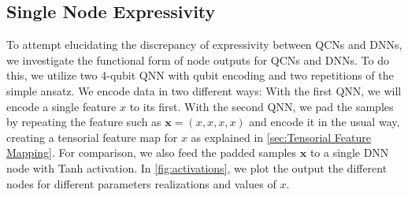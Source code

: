 \subsection{Single Node Expressivity}\label{sec:Single Node Expressivity}
To attempt elucidating the discrepancy of expressivity between QCNs and DNNs, we investigate the functional form of node outputs for QCNs and DNNs. To do this, we utilize two 4-qubit QNN with qubit encoding and two repetitions of the simple ansatz. We encode data in two different ways: With the first QNN, we will encode a single feature $x$ to its first. With the second QNN, we pad the samples by repeating the feature  such as $\boldsymbol{x} = (x, x, x, x)$ and encode it in the usual way, creating a tensorial feature map for $x$ as explained in \autoref{sec:Tensorial Feature Mapping}. For comparison, we also feed the padded samples $\boldsymbol{x}$ to a single DNN node with Tanh activation. In \autoref{fig:activations}, we plot the output the different nodes for different parameters realizations and values of $x$.

